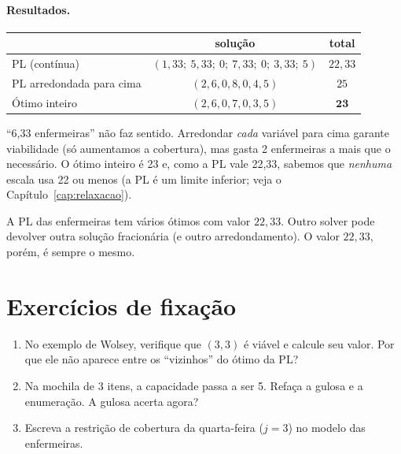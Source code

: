 \paragraph{Resultados.}
\begin{center}
\begin{tabular}{lcc}
\toprule
& solução & total\\
\midrule
PL (contínua) & $(1{,}33;\ 5{,}33;\ 0;\ 7{,}33;\ 0;\ 3{,}33;\ 5)$ & $22{,}33$\\
PL arredondada para cima & $(2,6,0,8,0,4,5)$ & $25$\\
Ótimo inteiro & $(2,6,0,7,0,3,5)$ & $\mathbf{23}$\\
\bottomrule
\end{tabular}
\end{center}
``6,33 enfermeiras'' não faz sentido. Arredondar \emph{cada} variável para cima garante viabilidade (só
aumentamos a cobertura), mas gasta 2 enfermeiras a mais que o necessário. O ótimo inteiro é 23 e, como a PL vale
22,33, sabemos que \emph{nenhuma} escala usa 22 ou menos (a PL é um limite inferior; veja o
Capítulo~\ref{cap:relaxacao}).

\begin{atencao}
A PL das enfermeiras tem vários ótimos com valor $22{,}33$. Outro solver pode devolver outra solução fracionária
(e outro arredondamento). O valor $22{,}33$, porém, é sempre o mesmo.
\end{atencao}

\section*{Exercícios de fixação}
\begin{enumerate}[label=\textbf{2.\arabic*}]
  \item No exemplo de Wolsey, verifique que $(3,3)$ é viável e calcule seu valor. Por que ele não aparece entre os
  ``vizinhos'' do ótimo da PL?
  \item Na mochila de 3 itens, a capacidade passa a ser 5. Refaça a gulosa e a enumeração. A gulosa acerta agora?
  \item Escreva a restrição de cobertura da quarta-feira ($j=3$) no modelo das enfermeiras.
\end{enumerate}
